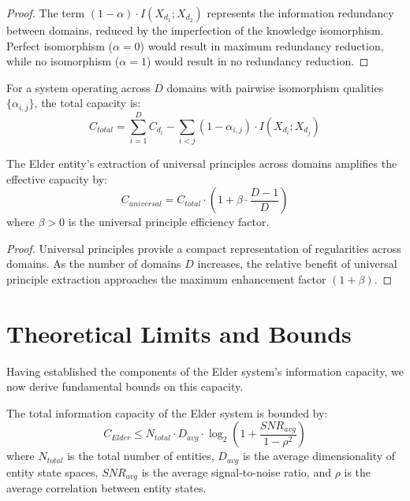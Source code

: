 \begin{proof}
The term $(1 - \alpha) \cdot I(X_{d_1}; X_{d_2})$ represents the information redundancy between domains, reduced by the imperfection of the knowledge isomorphism. Perfect isomorphism ($\alpha = 0$) would result in maximum redundancy reduction, while no isomorphism ($\alpha = 1$) would result in no redundancy reduction.
\end{proof}

\begin{corollary}
For a system operating across $D$ domains with pairwise isomorphism qualities $\{\alpha_{i,j}\}$, the total capacity is:
\begin{equation}
C_{total} = \sum_{i=1}^{D} C_{d_i} - \sum_{i < j} (1 - \alpha_{i,j}) \cdot I(X_{d_i}; X_{d_j})
\end{equation}
\end{corollary}

\begin{theorem}
The Elder entity's extraction of universal principles across domains amplifies the effective capacity by:
\begin{equation}
C_{universal} = C_{total} \cdot \left(1 + \beta \cdot \frac{D-1}{D}\right)
\end{equation}
where $\beta > 0$ is the universal principle efficiency factor.
\end{theorem}

\begin{proof}
Universal principles provide a compact representation of regularities across domains. As the number of domains $D$ increases, the relative benefit of universal principle extraction approaches the maximum enhancement factor $(1 + \beta)$.
\end{proof}

\section{Theoretical Limits and Bounds}

Having established the components of the Elder system's information capacity, we now derive fundamental bounds on this capacity.

\begin{theorem}
The total information capacity of the Elder system is bounded by:
\begin{equation}
C_{Elder} \leq N_{total} \cdot D_{avg} \cdot \log_2\left(1 + \frac{SNR_{avg}}{1 - \rho^2}\right)
\end{equation}
where $N_{total}$ is the total number of entities, $D_{avg}$ is the average dimensionality of entity state spaces, $SNR_{avg}$ is the average signal-to-noise ratio, and $\rho$ is the average correlation between entity states.
\end{theorem}

